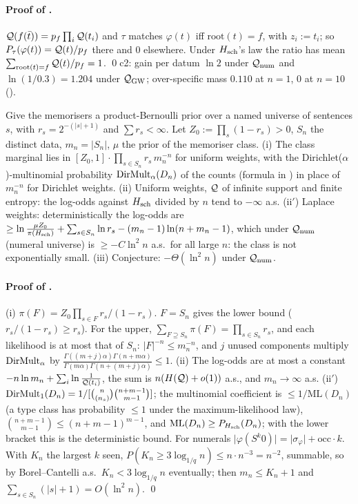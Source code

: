 \paragraph{Proof of .} $\mathcal{Q}(f(\bar t))=p_f\prod_i\mathcal{Q}(t_i)$ and $\tau$ matches $\varphi(t)$ iff $\mathrm{root}(t)=f$, with $z_i:=t_i$; so $P_\tau(\varphi(t))=\mathcal{Q}(t)/p_f$ there and $0$ elsewhere. Under $H_{\mathrm{sch}}$'s law the ratio has mean $\sum_{\mathrm{root}(t)=f}\mathcal{Q}(t)/p_f=1$. \qed c2: gain per datum $\ln2$ under $\mathcal{Q}_{\mathrm{num}}$ and $\ln(1/0.3)=1.204$ under $\mathcal{Q}_{\mathrm{GW}}$; over-specific mass $0.110$ at $n=1$, $0$ at $n=10$ ().

\begin{proposition}[Memorisers]\label{prop:univ:memo}
Give the memorisers a product-Bernoulli prior over a named universe of sentences $s$, with $r_s=2^{-(\lvert s\rvert+1)}$ and $\sum r_s<\infty$. Let $Z_0:=\prod_s(1-r_s)>0$, $S_n$ the distinct data, $m_n=\lvert S_n\rvert$, $\mu$ the prior of the memoriser class. \textup{(i)} The class marginal lies in $[Z_0,1]\cdot\prod_{s\in S_n}r_s\,m_n^{-n}$ for uniform weights, with the Dirichlet($\alpha$)-multinomial probability $\mathrm{DirMult}_\alpha(D_n)$ of the counts (formula in ) in place of $m_n^{-n}$ for Dirichlet weights. \textup{(ii)} Uniform weights, $\mathcal{Q}$ of infinite support and finite entropy: the log-odds against $H_{\mathrm{sch}}$ divided by $n$ tend to $-\infty$ a.s. \textup{(ii$'$)} Laplace weights: deterministically the log-odds are $\ge\ln\frac{\mu Z_0}{\pi(H_{\mathrm{sch}})}+\sum_{s\in S_n}\ln r_s-(m_n-1)\ln(n+m_n-1)$, which under $\mathcal{Q}_{\mathrm{num}}$ (numeral universe) is $\ge-C\ln^2n$ a.s.\ for all large $n$: the class is not exponentially small. \textup{(iii)} Conjecture: $-\Theta(\ln^2n)$ under $\mathcal{Q}_{\mathrm{num}}$.
\end{proposition}

\paragraph{Proof of .} (i) $\pi(F)=Z_0\prod_{s\in F}r_s/(1-r_s)$. $F=S_n$ gives the lower bound ($r_s/(1-r_s)\ge r_s$). For the upper, $\sum_{F\supseteq S_n}\pi(F)=\prod_{s\in S_n}r_s$, and each likelihood is at most that of $S_n$: $\lvert F\rvert^{-n}\le m_n^{-n}$, and $j$ unused components multiply $\mathrm{DirMult}_\alpha$ by $\frac{\Gamma((m+j)\alpha)\Gamma(n+m\alpha)}{\Gamma(m\alpha)\Gamma(n+(m+j)\alpha)}\le1$. (ii) The log-odds are at most a constant $-n\ln m_n+\sum_i\ln\frac1{\mathcal{Q}(t_i)}$, the sum is $n(H(\mathcal{Q})+o(1))$ a.s., and $m_n\to\infty$ a.s. (ii$'$) $\mathrm{DirMult}_1(D_n)=1/[\binom n{(n_s)}\binom{n+m-1}{m-1}]$; the multinomial coefficient is $\le1/\mathrm{ML}(D_n)$ (a type class has probability $\le1$ under the maximum-likelihood law), $\binom{n+m-1}{m-1}\le(n+m-1)^{m-1}$, and $\mathrm{ML}(D_n)\ge P_{H_{\mathrm{sch}}}(D_n)$; with the lower bracket this is the deterministic bound. For numerals $\lvert\varphi(S^k0)\rvert=\lvert\sigma_\varphi\rvert+\mathrm{occ}\cdot k$. With $K_n$ the largest $k$ seen, $P(K_n\ge3\log_{1/q}n)\le n\cdot n^{-3}=n^{-2}$, summable, so by Borel--Cantelli a.s.\ $K_n<3\log_{1/q}n$ eventually; then $m_n\le K_n+1$ and $\sum_{s\in S_n}(\lvert s\rvert+1)=O(\ln^2n)$. \qed

